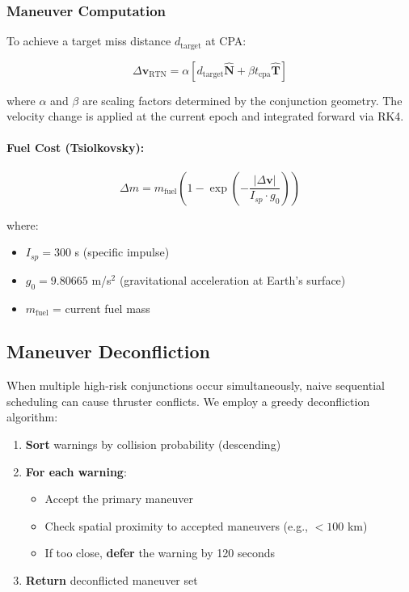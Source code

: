 \documentclass[11pt,a4paper]{article}
\begin{document}
\subsubsection{Maneuver Computation}

To achieve a target miss distance $d_{\text{target}}$ at CPA:

\begin{equation}
\Delta \mathbf{v}_{\text{RTN}} = \alpha \left[ d_{\text{target}} \mathbf{\hat{N}} + \beta t_{\text{cpa}} \mathbf{\hat{T}} \right]
\end{equation}

where $\alpha$ and $\beta$ are scaling factors determined by the conjunction geometry. The velocity change is applied at the current epoch and integrated forward via RK4.

\paragraph{Fuel Cost (Tsiolkovsky):}
\begin{equation}
\Delta m = m_{\text{fuel}} \left(1 - \exp\left(-\frac{|\Delta \mathbf{v}|}{I_{sp} \cdot g_0}\right)\right)
\end{equation}

where:
\begin{itemize}
    \item $I_{sp} = 300$ s (specific impulse)
    \item $g_0 = 9.80665$ m/s$^2$ (gravitational acceleration at Earth's surface)
    \item $m_{\text{fuel}}$ = current fuel mass
\end{itemize}

\subsection{Maneuver Deconfliction}

When multiple high-risk conjunctions occur simultaneously, naive sequential scheduling can cause thruster conflicts. We employ a greedy deconfliction algorithm:

\begin{enumerate}
    \item \textbf{Sort} warnings by collision probability (descending)
    \item \textbf{For each warning}:
    \begin{itemize}
        \item Accept the primary maneuver
        \item Check spatial proximity to accepted maneuvers (e.g., $< 100$ km)
        \item If too close, \textbf{defer} the warning by 120 seconds
    \end{itemize}
    \item \textbf{Return} deconflicted maneuver set
\end{enumerate}
\end{document}
